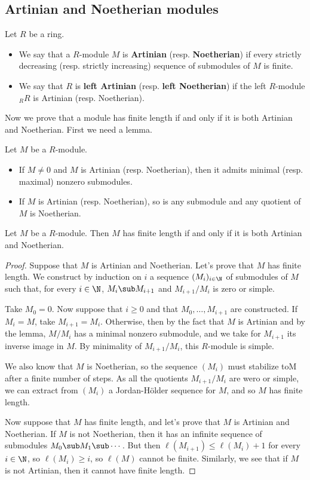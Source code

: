 \subsection{Artinian and Noetherian modules}
\begin{definition}
Let $R$ be a ring.
\begin{itemize}
\item We say that a $R$-module $M$ is \textbf{Artinian} (resp. \textbf{Noetherian}) if every strictly decreasing (resp. strictly increasing) sequence of submodules of $M$ is finite.
\item We say that $R$ is \textbf{left Artinian} (resp. \textbf{left Noetherian}) if the left $R$-module $_{R}R$ is Artinian (resp. Noetherian).
\end{itemize}
\end{definition}
Now we prove that a module has finite length if and only if it is both Artinian and Noetherian. First we need a lemma.
\begin{lemma}
Let $M$ be a $R$-module.
\begin{itemize}
\item If $M\neq 0$ and $M$ is Artinian (resp. Noetherian), then it admits minimal (resp. maximal) nonzero submodules.
\item If $M$ is Artinian (resp. Noetherian), so is any submodule and any quotient of $M$ is Noetherian.
\end{itemize}
\end{lemma}
\begin{proposition}\label{module finite length iff}
Let $M$ be a $R$-module. Then $M$ has finite length if and only if it is both
Artinian and Noetherian.
\end{proposition}
\begin{proof}
Suppose that $M$ is Artinian and Noetherian. Let's prove that $M$ has finite length. We construct by induction on $i$ a sequence $(M_i)_{i\in\N}$ of submodules of $M$ such that, for every $i\in\N$, $M_i\sub M_{i+1}$ and $M_{i+1}/M_i$ is zero or simple.\par
Take $M_0=0$. Now suppose that $i\geq0$ and that $M_0,\dots,M_{i+1}$ are constructed. If $M_i=M$, take $M_{i+1}=M_i$. Otherwise, then by the fact that $M$ is Artinian and by the lemma, $M/M_i$ has a minimal nonzero submodule, and we take for $M_{i+1}$ its inverse image in $M$. By minimality of $M_{i+1}/M_i$, this $R$-module is simple.\par
We also know that $M$ is Noetherian, so the sequence $(M_i)$ must stabilize toM after a finite number of steps. As all the quotients $M_{i+1}/M_i$ are wero or simple, we can extract from $(M_i)$ a Jordan-H\"older sequence for $M$, and so $M$ has finite length.\par
Now suppose that $M$ has finite length, and let's prove that $M$ is Artinian and Noetherian. If $M$ is not Noetherian, then it has an infinite sequence of submodules $M_0\sub M_1\sub\cdots$. But then $\ell(M_{i+1})\leq\ell(M_i)+1$ for every $i\in\N$, so $\ell(M_i)\geq i$, so $\ell(M)$ cannot be finite. Similarly, we see that if $M$ is not Artinian, then it cannot have finite length.
\end{proof}
